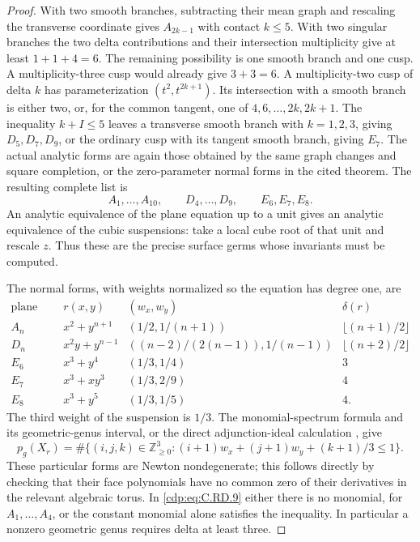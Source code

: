 \begin{proof}
With two smooth branches, subtracting their mean graph
and rescaling the transverse coordinate gives
$A_{2k-1}$ with contact $k\le5$. With two singular
branches the two delta contributions and their
intersection multiplicity give at least $1+1+4=6$.
The remaining possibility is one smooth branch and
one cusp. A multiplicity-three cusp would already
give $3+3=6$. A multiplicity-two cusp of delta $k$
has parameterization $(t^2,t^{2k+1})$.
Its intersection with a smooth branch is either two,
or, for the common tangent, one of
$4,6,\ldots,2k,2k+1$.
The inequality $k+I\le5$ leaves a transverse smooth
branch with $k=1,2,3$, giving $D_5,D_7,D_9$, or the
ordinary cusp with its tangent smooth branch, giving
$E_7$. The actual analytic forms are again those
obtained by the same graph changes and square
completion, or the zero-parameter normal forms in the
cited theorem. The resulting complete list is
\[
              A_1,\ldots,A_{10},\qquad
              D_4,\ldots,D_9,\qquad E_6,E_7,E_8.
\tag{C.RD.7}\label{cdp:eq:C.RD.7}
\]
An analytic equivalence of the plane equation up to
a unit gives an analytic equivalence of the cubic
suspensions: take a local cube root of that unit and
rescale $z$. Thus these are the precise surface germs
whose invariants must be computed.

The normal forms, with weights normalized so the
equation has degree one, are
\[
\begin{array}{c|c|c|c}
 \text{plane type}&r(x,y)&(w_x,w_y)&\delta(r)\\\hline
 A_n&x^2+y^{n+1}&(1/2,1/(n+1))&\lfloor(n+1)/2\rfloor\\
 D_n&x^2y+y^{n-1}&((n-2)/(2(n-1)),1/(n-1))
                         &\lfloor(n+2)/2\rfloor\\
 E_6&x^3+y^4&(1/3,1/4)&3\\
 E_7&x^3+xy^3&(1/3,2/9)&4\\
 E_8&x^3+y^5&(1/3,1/5)&4.
\end{array}
\tag{C.RD.8}\label{cdp:eq:C.RD.8}
\]
The third weight of the suspension is $1/3$.
The monomial-spectrum formula and its geometric-genus
interval, or the direct adjunction-ideal calculation
\cite[Theorem 2.1.1 and Corollary 2.1.3]{MerleTeissier1977},
give
\[
 p_g(X_r)=\#\{(i,j,k)\in\mathbb Z_{\ge0}^3:
          (i+1)w_x+(j+1)w_y+(k+1)/3\le1\}.
\tag{C.RD.9}\label{cdp:eq:C.RD.9}
\]
These particular forms are Newton nondegenerate;
this follows directly by checking that their face
polynomials have no common zero of their derivatives
in the relevant algebraic torus. In \eqref{cdp:eq:C.RD.9} either
there is no monomial, for $A_1,\ldots,A_4$, or the
constant monomial alone satisfies the inequality.
In particular a nonzero geometric genus requires
delta at least three.


\end{proof}
